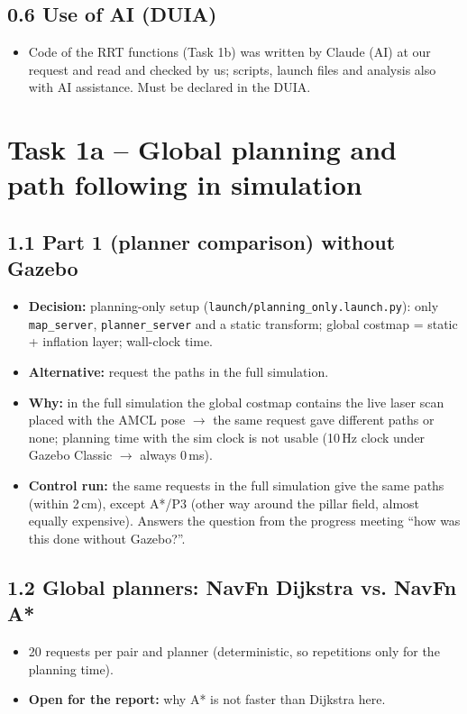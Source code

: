 \documentclass[10pt]{article}
\newcommand{\pkg}[1]{\texttt{#1}}
\begin{document}
\subsection*{0.6 Use of AI (DUIA)}
\begin{itemize}
  \item Code of the RRT functions (Task 1b) was written by Claude (AI) at our request and read and checked by us; scripts, launch files and analysis also with AI assistance. Must be declared in the DUIA.
\end{itemize}

\section{Task 1a -- Global planning and path following in simulation}

\subsection*{1.1 Part 1 (planner comparison) without Gazebo}
\begin{itemize}
  \item \textbf{Decision:} planning-only setup (\pkg{launch/planning\_only.launch.py}): only \pkg{map\_server}, \pkg{planner\_server} and a static transform; global costmap = static + inflation layer; wall-clock time.
  \item \textbf{Alternative:} request the paths in the full simulation.
  \item \textbf{Why:} in the full simulation the global costmap contains the live laser scan placed with the AMCL pose $\rightarrow$ the same request gave different paths or none; planning time with the sim clock is not usable (10\,Hz clock under Gazebo Classic $\rightarrow$ always 0\,ms).
  \item \textbf{Control run:} the same requests in the full simulation give the same paths (within 2\,cm), except A*/P3 (other way around the pillar field, almost equally expensive). Answers the question from the progress meeting ``how was this done without Gazebo?''.
\end{itemize}

\subsection*{1.2 Global planners: NavFn Dijkstra vs. NavFn A*}
\begin{itemize}
  \item 20 requests per pair and planner (deterministic, so repetitions only for the planning time).
  \item \textbf{Open for the report:} why A* is not faster than Dijkstra here.
\end{itemize}
\end{document}
